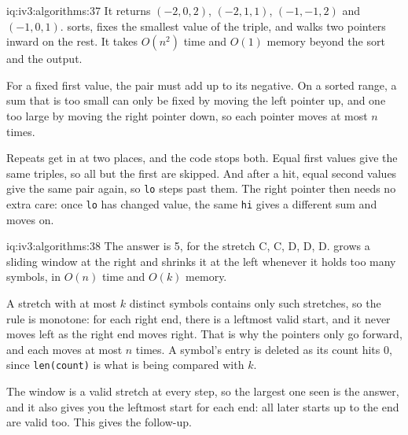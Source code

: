 \begin{solution}{iq:iv3:algorithms:37}
It returns $(-2, 0, 2)$, $(-2, 1, 1)$, $(-1, -1, 2)$ and $(-1, 0, 1)$.  sorts, fixes the smallest value of the triple, and walks two pointers inward on the rest. It takes $O(n^2)$ time and $O(1)$ memory beyond the sort and the output.
\label{lst:iv3:al:threesum}

For a fixed first value, the pair must add up to its negative. On a sorted range, a sum that is too small can only be fixed by moving the left pointer up, and one too large by moving the right pointer down, so each pointer moves at most $n$ times.

Repeats get in at two places, and the code stops both. Equal first values give the same triples, so all but the first are skipped. And after a hit, equal second values give the same pair again, so \texttt{lo} steps past them. The right pointer then needs no extra care: once \texttt{lo} has changed value, the same \texttt{hi} gives a different sum and moves on.

\end{solution}

\begin{solution}{iq:iv3:algorithms:38}
The answer is 5, for the stretch C, C, D, D, D.  grows a sliding window at the right and shrinks it at the left whenever it holds too many symbols, in $O(n)$ time and $O(k)$ memory.
\label{lst:iv3:al:kdistinct}

A stretch with at most $k$ distinct symbols contains only such stretches, so the rule is monotone: for each right end, there is a leftmost valid start, and it never moves left as the right end moves right. That is why the pointers only go forward, and each moves at most $n$ times. A symbol's entry is deleted as its count hits 0, since \texttt{len(count)} is what is being compared with $k$.

The window is a valid stretch at every step, so the largest one seen is the answer, and it also gives you the leftmost start for each end: all later starts up to the end are valid too. This gives the follow-up.

\end{solution}

